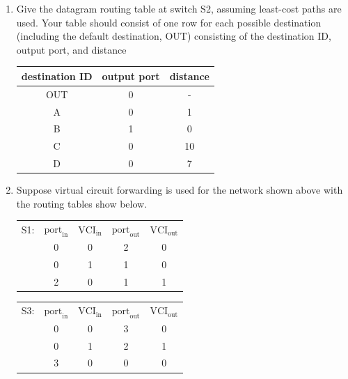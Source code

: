 \documentclass[10pt, a4paper]{article}
\begin{document}
\begin{enumerate}
\begin{center}
    \end{center}
    \begin{enumerate}
    \item Give the datagram routing table at switch S2, assuming least-cost paths are used. Your table should consist of one row for each possible destination (including the default destination, OUT) consisting of the destination ID, output port, and distance\\
        \color{blue}
        \begin{tabular}{ccc}
            \toprule
            destination ID & output port & distance\\
            \hline
            OUT & 0 & -\\
            A & 0 & 1\\
            B & 1 & 0\\
            C & 0 & 10\\
            D & 0 & 7\\
            \bottomrule
        \end{tabular}
        \color{black}
    \item Suppose virtual circuit forwarding is used for the network shown above with the routing tables show below.
        \begin{center}
            \begin{tabular}{|c|c|c|c|c|}
                \hline
                S1: & $\mbox{port}_{\mbox{in}}$ & $\mbox{VCI}_{\mbox{in}}$ & $\mbox{port}_{\mbox{out}}$ & $\mbox{VCI}_{\mbox{out}}$\\
                \cline {2-5}
                & 0 & 0 & 2 & 0\\
                \cline {2-5}
                & 0 & 1 & 1 & 0\\
                \cline {2-5}
                & 2 & 0 & 1 & 1\\
                \hline
            \end{tabular}\qquad
            \begin{tabular}{|c|c|c|c|c|}
                \hline
                S3: & $\mbox{port}_{\mbox{in}}$ & $\mbox{VCI}_{\mbox{in}}$ & $\mbox{port}_{\mbox{out}}$ & $\mbox{VCI}_{\mbox{out}}$\\
                \cline {2-5}
                & 0 & 0 & 3 & 0\\
                \cline {2-5}
                & 0 & 1 & 2 & 1\\
                \cline {2-5}
                & 3 & 0 & 0 & 0\\
                \hline
            \end{tabular}\\


\end{center}
\end{enumerate}
\end{enumerate}
\end{document}
